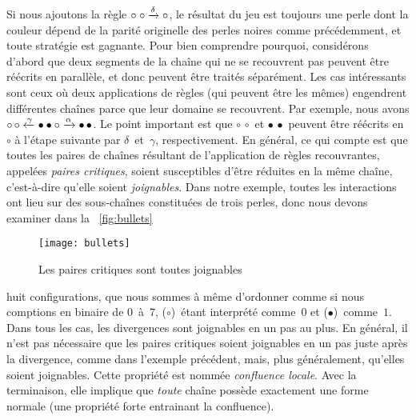 Si nous ajoutons la règle \(\circ\; \circ \xrightarrow{\smash{\delta}}
\circ\), le résultat du jeu est toujours une perle dont la couleur
dépend de la parité originelle des perles noires comme précédemment,
et toute stratégie est gagnante. Pour bien comprendre pourquoi,
considérons d'abord que deux segments de la chaîne qui ne se
recouvrent pas peuvent être réécrits en parallèle, et donc peuvent
être traités séparément. Les cas intéressants sont ceux où deux
applications de règles (qui peuvent être les mêmes) engendrent
différentes chaînes parce que leur domaine se recouvrent.  Par
exemple, nous avons \(\circ \, \circ \xleftarrow{\smash{\gamma}}
\bullet \bullet \circ \xrightarrow{\smash{\alpha}} \bullet \,
\bullet\). Le point important est que \(\circ \, \circ\) et \(\bullet
\, \bullet\) peuvent être réécrits en~\(\circ\) à l'étape suivante par
\(\delta\)~et~\(\gamma\), respectivement. En général, ce qui compte
est que toutes les paires de chaînes résultant de l'application de
règles recouvrantes, appelées \emph{paires critiques}, soient susceptibles d'être réduites en
la même chaîne, c'est-à-dire qu'elle soient \emph{joignables}. Dans
notre exemple, toutes les interactions ont lieu sur des sous-chaînes
constituées de trois perles, donc nous devons examiner dans la
\fig~\vref{fig:bullets}
\begin{figure}[t]
\centering
\texttt{[image: bullets]}
\caption{Les paires critiques sont toutes joignables}
\label{fig:bullets}
\end{figure}
huit configurations, que nous sommes à même d'ordonner comme si nous
comptions en binaire de \(0\)~à~\(7\), (\(\circ\))~étant interprété
comme~\(0\) et (\(\bullet\))~comme~\(1\). Dans tous les cas, les
divergences sont joignables en un pas au plus. En général, il n'est
pas nécessaire que les paires critiques soient joignables en un pas
juste après la divergence, comme dans l'exemple précédent, mais, plus
généralement, qu'elles soient joignables. Cette propriété est nommée
\emph{confluence locale}. Avec la terminaison, elle implique que \emph{toute} chaîne
possède exactement une forme normale (une propriété forte entrainant
la confluence).

